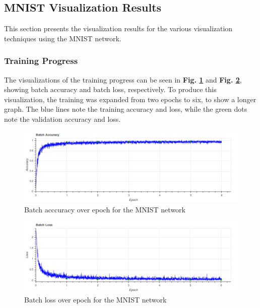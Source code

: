\subsection{MNIST Visualization Results} \label{mnist-vis-results}

This section presents the visualization results for the various visualization techniques using the MNIST network.

\subsubsection{Training Progress}

The visualizations of the training progress can be seen in \textbf{Fig. \ref{mnist:accuracy}} and \textbf{Fig. \ref{mnist:loss}}, showing batch accuracy and batch loss, respectively. To produce this visualization, the training was expanded from two epochs to six, to show a longer graph. The blue lines note the training accuracy and loss, while the green dots note the validation accuracy and loss.


\begin{figure}
    \centering
    \includegraphics[width=1\textwidth]{fig/results/training_progress/accuracy.png}
    \caption{Batch acccuracy over epoch for the MNIST network}
    \label{mnist:accuracy}
\end{figure}

\begin{figure}
    \centering
    \includegraphics[width=1\textwidth]{fig/results/training_progress/loss.png}
    \caption{Batch loss over epoch for the MNIST network}
    \label{mnist:loss}
\end{figure}

